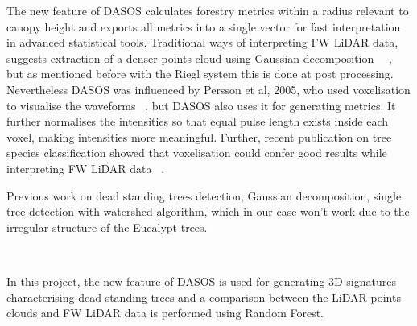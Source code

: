 \documentclass{article}
\begin{document}
The new feature of DASOS calculates forestry metrics within a radius relevant to canopy height and exports all metrics into a single vector for fast interpretation in advanced statistical tools.  Traditional ways of interpreting FW LiDAR data, suggests extraction of a denser points cloud using Gaussian decomposition ~\cite{Neuenschwander2009}~\cite{Reitberger2008}, but as mentioned before with the Riegl system this is done at post processing. Nevertheless DASOS was influenced by Persson et al, 2005, who used voxelisation to visualise the waveforms ~\cite{Persson2005}, but DASOS also uses it for generating metrics. It further normalises the intensities so that equal pulse length exists inside each voxel, making intensities more meaningful. Further, recent publication on tree species classification showed that voxelisation could confer good results while interpreting FW LiDAR data ~\cite{Cao2016}. 

Previous work on dead standing trees detection, Gaussian decomposition, single tree detection with watershed algorithm, which in our case won't work due to the irregular structure of the Eucalypt trees.  ~\cite{Yao2012} 

~\cite{Polewski2015}


In this project, the new feature of DASOS is used for generating 3D signatures characterising dead standing trees and a comparison between the LiDAR points clouds and FW LiDAR data is performed using Random Forest.




  \newpage
  
  {}
\thispagestyle{empty}
\end{document}
